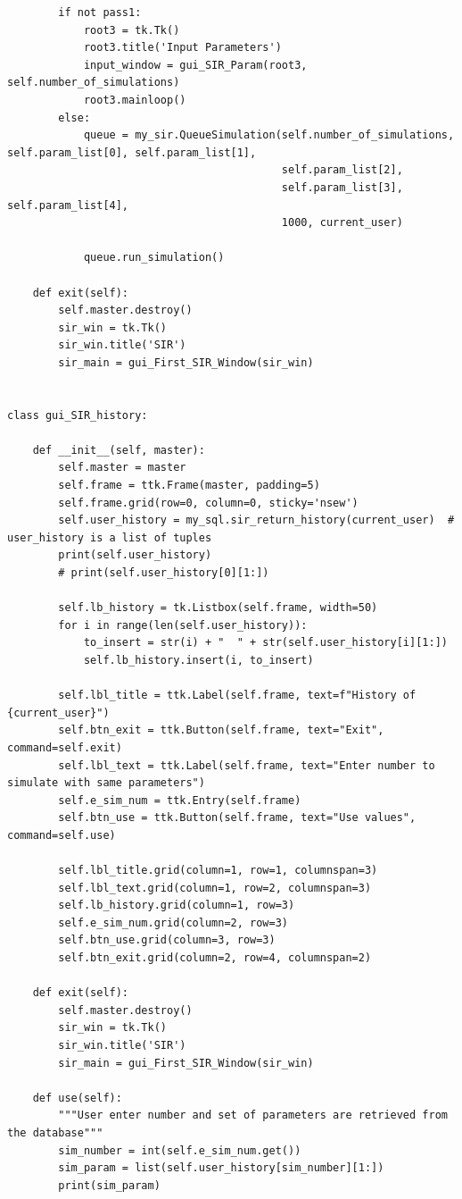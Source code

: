\documentclass[11pt, a4paper]{article}
\begin{document}
\begin{lstlisting}
        if not pass1:
            root3 = tk.Tk()
            root3.title('Input Parameters')
            input_window = gui_SIR_Param(root3, self.number_of_simulations)
            root3.mainloop()
        else:
            queue = my_sir.QueueSimulation(self.number_of_simulations, self.param_list[0], self.param_list[1],
                                           self.param_list[2],
                                           self.param_list[3], self.param_list[4],
                                           1000, current_user)

            queue.run_simulation()

    def exit(self):
        self.master.destroy()
        sir_win = tk.Tk()
        sir_win.title('SIR')
        sir_main = gui_First_SIR_Window(sir_win)


class gui_SIR_history:

    def __init__(self, master):
        self.master = master
        self.frame = ttk.Frame(master, padding=5)
        self.frame.grid(row=0, column=0, sticky='nsew')
        self.user_history = my_sql.sir_return_history(current_user)  # user_history is a list of tuples
        print(self.user_history)
        # print(self.user_history[0][1:])

        self.lb_history = tk.Listbox(self.frame, width=50)
        for i in range(len(self.user_history)):
            to_insert = str(i) + "  " + str(self.user_history[i][1:])
            self.lb_history.insert(i, to_insert)

        self.lbl_title = ttk.Label(self.frame, text=f"History of {current_user}")
        self.btn_exit = ttk.Button(self.frame, text="Exit", command=self.exit)
        self.lbl_text = ttk.Label(self.frame, text="Enter number to simulate with same parameters")
        self.e_sim_num = ttk.Entry(self.frame)
        self.btn_use = ttk.Button(self.frame, text="Use values", command=self.use)

        self.lbl_title.grid(column=1, row=1, columnspan=3)
        self.lbl_text.grid(column=1, row=2, columnspan=3)
        self.lb_history.grid(column=1, row=3)
        self.e_sim_num.grid(column=2, row=3)
        self.btn_use.grid(column=3, row=3)
        self.btn_exit.grid(column=2, row=4, columnspan=2)

    def exit(self):
        self.master.destroy()
        sir_win = tk.Tk()
        sir_win.title('SIR')
        sir_main = gui_First_SIR_Window(sir_win)

    def use(self):
        """User enter number and set of parameters are retrieved from the database"""
        sim_number = int(self.e_sim_num.get())
        sim_param = list(self.user_history[sim_number][1:])
        print(sim_param)


\end{lstlisting}
\end{document}
